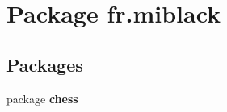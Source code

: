 \section{Package fr.\-miblack}
\label{namespacefr_1_1miblack}
\subsection*{Packages}
\begin{DoxyCompactItemize}
\item 
package {\bf chess}
\end{DoxyCompactItemize}
